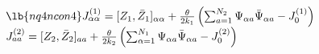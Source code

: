 \begin{equation}
\begin{array}{l}
\lb{nq4ncon4}
J_{\alpha {\alpha}}^{(1)}  =
 [Z_{1},{\bar{Z}_{1}}]_{\alpha {\alpha}}+
 \frac{\theta }{2k_{1}}\left( \sum_{a=1}^{N_{2}}
\Psi _{\alpha a}{\bar{\Psi}}_{ {\alpha} {a}}
-J_{0}^{(1)}\right) \\
J_{a {a}}^{(2)}  = 
[Z_{2},{\bar{Z}_{2}}]_{a {a}}+\frac{\theta }
{2k_{2}} \left( \sum_{\alpha =1}^{N_{1}}
\Psi _{\alpha a}{\bar{\Psi}}_{{\alpha}{a} }-
J_{0}^{(2)} \right)
\end{array}
\end{equation}

